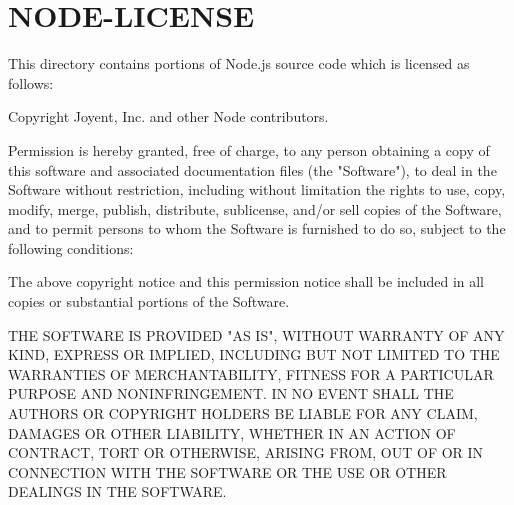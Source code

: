 \chapter{NODE-\/\+LICENSE}
\hypertarget{md_tests_2security_2node__modules_2_8pnpm_2ts-node_0d10_89_82___0dtypes_09node_0d22_813_810__typ15c5fbfe762868366d4943f8c5781f93}{}\label{md_tests_2security_2node__modules_2_8pnpm_2ts-node_0d10_89_82___0dtypes_09node_0d22_813_810__typ15c5fbfe762868366d4943f8c5781f93}
This directory contains portions of Node.\+js source code which is licensed as follows\+:



Copyright Joyent, Inc. and other Node contributors.

Permission is hereby granted, free of charge, to any person obtaining a copy of this software and associated documentation files (the "{}\+Software"{}), to deal in the Software without restriction, including without limitation the rights to use, copy, modify, merge, publish, distribute, sublicense, and/or sell copies of the Software, and to permit persons to whom the Software is furnished to do so, subject to the following conditions\+:

The above copyright notice and this permission notice shall be included in all copies or substantial portions of the Software.

THE SOFTWARE IS PROVIDED "{}\+AS IS"{}, WITHOUT WARRANTY OF ANY KIND, EXPRESS OR IMPLIED, INCLUDING BUT NOT LIMITED TO THE WARRANTIES OF MERCHANTABILITY, FITNESS FOR A PARTICULAR PURPOSE AND NONINFRINGEMENT. IN NO EVENT SHALL THE AUTHORS OR COPYRIGHT HOLDERS BE LIABLE FOR ANY CLAIM, DAMAGES OR OTHER LIABILITY, WHETHER IN AN ACTION OF CONTRACT, TORT OR OTHERWISE, ARISING FROM, OUT OF OR IN CONNECTION WITH THE SOFTWARE OR THE USE OR OTHER DEALINGS IN THE SOFTWARE. 